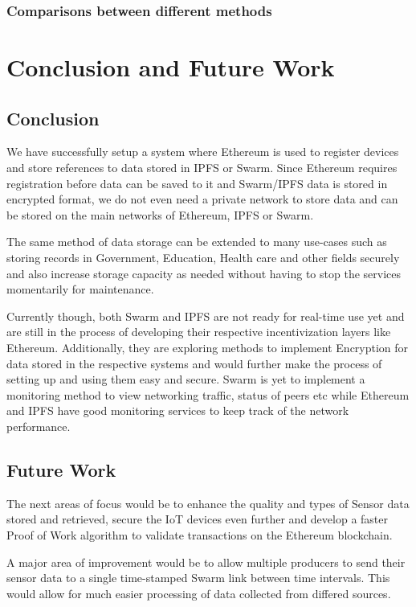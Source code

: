 \documentclass[11pt,openright]{report}
\begin{document}
\subsection{Comparisons between different methods}


\chapter{Conclusion and Future Work} \label{chapter:conclusion}
\section{Conclusion}
We have successfully setup a system where Ethereum is used to register devices and store references to data stored in IPFS or Swarm. Since Ethereum requires registration before data can be saved to it and Swarm/IPFS data is stored in encrypted format, we do not even need a private network to store data and can be stored on the main networks of Ethereum, IPFS or Swarm. 

The same method of data storage can be extended to many use-cases such as storing records in Government, Education, Health care and other fields securely and also increase storage capacity as needed without having to stop the services momentarily for maintenance.

Currently though, both Swarm and IPFS are not ready for real-time use yet and are still in the process of developing their respective incentivization layers \cite{ethersphere2016sw3} like Ethereum. Additionally, they are exploring methods to implement Encryption for data stored in the respective systems and would further make the process of setting up and using them easy and secure. Swarm is yet to implement a monitoring method to view networking traffic, status of peers etc while Ethereum and IPFS have good monitoring services to keep track of the network performance.

\section{Future Work}
The next areas of focus would be to enhance the quality and types of Sensor data stored and retrieved, secure the IoT devices even further and develop a faster Proof of Work algorithm to validate transactions on the Ethereum blockchain. 

A major area of improvement would be to allow multiple producers to send their sensor data to a single time-stamped Swarm link between time intervals. This would allow for much easier processing of data collected from differed sources.
\end{document}
